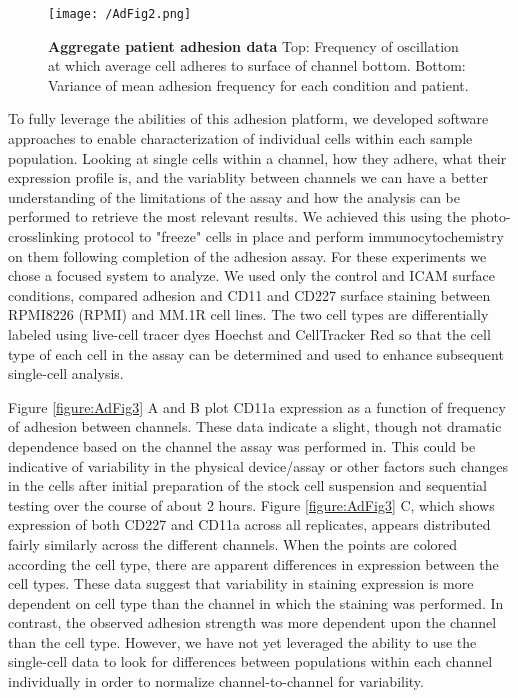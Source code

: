 \begin{figure}[ht] %
\centering
\texttt{[image: /AdFig2.png]}
\caption[\textbf{Aggregate patient adhesion data}]{\textbf{Aggregate patient adhesion data} Top: Frequency of oscillation at which average cell adheres to surface of channel bottom. Bottom: Variance of mean adhesion frequency for each condition and patient.}
\label{figure:AdFig2}
\end{figure}

To fully leverage the abilities of this adhesion platform, we developed software approaches to enable characterization of individual cells within each sample population. Looking at single cells within a channel, how they adhere, what their expression profile is, and the variablity between channels we can have a better understanding of the limitations of the assay and how the analysis can be performed to retrieve the most relevant results. We achieved this using the photo-crosslinking protocol to "freeze" cells in place and perform immunocytochemistry on them following completion of the adhesion assay. For these experiments we chose a focused system to analyze. We used only the control and ICAM surface conditions, compared adhesion and CD11 and CD227 surface staining between RPMI8226 (RPMI) and MM.1R cell lines. The two cell types are differentially labeled using live-cell tracer dyes Hoechst and CellTracker Red so that the cell type of each cell in the assay can be determined and used to enhance subsequent single-cell analysis.

Figure \ref{figure:AdFig3} A and B plot CD11a expression as a function of frequency of adhesion between channels. These data indicate a slight, though not dramatic dependence based on the channel the assay was performed in. This could be indicative of variability in the physical device\slash assay or other factors such changes in the cells after initial preparation of the stock cell suspension and sequential testing over the course of about 2 hours. Figure \ref{figure:AdFig3} C, which shows expression of both CD227 and CD11a across all replicates, appears distributed fairly similarly across the different channels. When the points are colored according the cell type, there are apparent differences in expression between the cell types. These data suggest that variability in staining expression is more dependent on cell type than the channel in which the staining was performed. In contrast, the observed adhesion strength was more dependent upon the channel than the cell type. However, we have not yet leveraged the ability to use the single-cell data to look for differences between populations within each channel individually in order to normalize channel-to-channel for variability.

